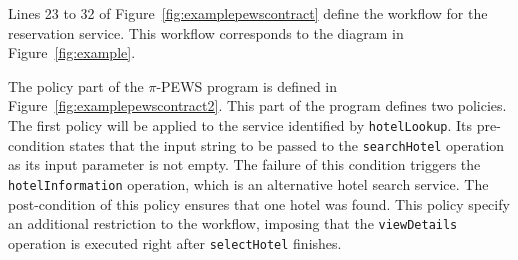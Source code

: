 \documentclass{sig-alternate}
\begin{document}
Lines 23 to 32 of Figure~\ref{fig:examplepewscontract} define the workflow for
the reservation service. This workflow corresponds to the diagram in Figure~\ref{fig:example}.


%

The policy part of the $\pi$-PEWS program is defined in Figure~\ref{fig:examplepewscontract2}.
This part of the program defines two policies.
The first policy will be applied to the service identified by \texttt{hotelLookup}.
Its pre-condition states that the input string to be passed to the \texttt{searchHotel} operation as its input parameter is not empty.
The failure of this condition triggers the \texttt{hotelInformation} operation, which is an alternative hotel search service.
The post-condition of this policy ensures that one hotel was found.
This policy specify an additional restriction to the workflow, imposing that the \texttt{viewDetails} operation is executed right after \texttt{selectHotel} finishes.
\end{document}
